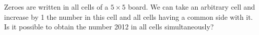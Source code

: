 Zeroes are written in all cells of a $5 \times 5$ board.  We can take an arbitrary cell and increase by 1 the number in this cell and all cells having a common side with it.  Is it possible to obtain the number 2012 in all cells simultaneously?
